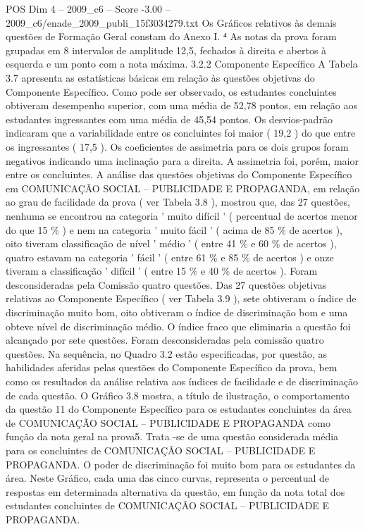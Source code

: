 \begin{textsample}{POS Dim 4 – 2009\_c6 – Score -3.00 – 2009\_c6/enade\_2009\_publi\_15f3034279.txt}
Os Gráficos relativos às demais questões de Formação Geral constam do Anexo I. ⁴ As notas da prova foram grupadas em 8 intervalos de amplitude 12,5, fechados à direita e abertos à esquerda e um ponto com a nota máxima. 3.2.2 Componente Específico A Tabela 3.7 apresenta as estatísticas básicas em relação às questões objetivas do Componente Específico.
Como pode ser observado, os estudantes concluintes obtiveram desempenho superior, com uma média de 52,78 pontos, em relação aos estudantes ingressantes com uma média de 45,54 pontos.
Os desvios-padrão indicaram que a variabilidade entre os concluintes foi maior ( 19,2 ) do que entre os ingressantes ( 17,5 ).
Os coeficientes de assimetria para os dois grupos foram negativos indicando uma inclinação para a direita.
A assimetria foi, porém, maior entre os concluintes.
A análise das questões objetivas do Componente Específico em COMUNICAÇÃO SOCIAL – PUBLICIDADE E PROPAGANDA, em relação ao grau de facilidade da prova ( ver Tabela 3.8 ), mostrou que, das 27 questões, nenhuma se encontrou na categoria ' muito difícil ' ( percentual de acertos menor do que 15 \% ) e nem na categoria ' muito fácil ' ( acima de 85 \% de acertos ), oito tiveram classificação de nível ' médio ' ( entre 41 \% e 60 \% de acertos ), quatro estavam na categoria ' fácil ' ( entre 61 \% e 85 \% de acertos ) e onze tiveram a classificação ' difícil ' ( entre 15 \% e 40 \% de acertos ).
Foram desconsideradas pela Comissão quatro questões.
Das 27 questões objetivas relativas ao Componente Específico ( ver Tabela 3.9 ), sete obtiveram o índice de discriminação muito bom, oito obtiveram o índice de discriminação bom e uma obteve nível de discriminação médio.
O índice fraco que eliminaria a questão foi alcançado por sete questões.
Foram desconsideradas pela comissão quatro questões.
Na sequência, no Quadro 3.2 estão especificadas, por questão, as habilidades aferidas pelas questões do Componente Específico da prova, bem como os resultados da análise relativa aos índices de facilidade e de discriminação de cada questão.
O Gráfico 3.8 mostra, a título de ilustração, o comportamento da questão 11 do Componente Específico para os estudantes concluintes da área de COMUNICAÇÃO SOCIAL – PUBLICIDADE E PROPAGANDA como função da nota geral na prova5.
Trata -se de uma questão considerada média para os concluintes de COMUNICAÇÃO SOCIAL – PUBLICIDADE E PROPAGANDA.
O poder de discriminação foi muito bom para os estudantes da área.
Neste Gráfico, cada uma das cinco curvas, representa o percentual de respostas em determinada alternativa da questão, em função da nota total dos estudantes concluintes de COMUNICAÇÃO SOCIAL – PUBLICIDADE E PROPAGANDA.

\end{textsample}
